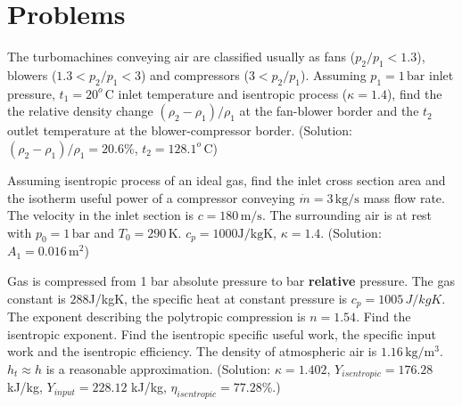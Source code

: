 \section{Problems}

\vspace{1cm}

The turbomachines conveying air are classified usually as fans ($p_2/p_1<1.3$), blowers ($1.3<p_2/p_1<3$) and compressors ($3<p_2/p_1$). Assuming $p_1=1\,\mathrm{bar}$ inlet pressure, $t_1=20^o\,\mathrm{C}$ inlet temperature and isentropic process ($\kappa=1.4$), find the the relative density change $(\rho_2-\rho_1)/\rho_1$ at the fan-blower border and the $t_2$ outlet temperature at the blower-compressor border. (Solution: $(\rho_2-\rho_1)/\rho_1=20.6\%$, $t_2=128.1^o\,\mathrm{C}$)

\vspace{1cm}

Assuming isentropic process of an ideal gas, find the inlet cross section area and the isotherm useful power of a compressor conveying $\dot m = 3\,\mathrm{kg/s}$ mass flow rate. The velocity in the inlet section is $c=180\,\mathrm{m/s}$. The surrounding air is at rest with $p_0=1\,\mathrm{bar}$ and $T_0=290\,\mathrm{K}$. $c_p=1000 \mathrm{J/kgK}$, $\kappa=1.4$.  (Solution: $A_1=0.016\,\mathrm{m^2}$)

\vspace{1cm}

Gas is compressed from 1 bar absolute pressure to  bar \textbf{relative} pressure. The gas constant is $288$J/kgK, the specific heat at constant pressure is $c_p = 1005\,J/kgK$. The exponent describing the polytropic compression is  $n = 1.54$. Find the isentropic exponent. Find the isentropic specific useful work, the specific input work and the isentropic efficiency. The density of atmospheric air is $1.16\, \mathrm{kg/m^3}$. $h_t\approx h$ is a reasonable approximation. 
(Solution: $\kappa=1.402$, $Y_{isentropic}=176.28$ kJ/kg, $Y_{input}=228.12$ kJ/kg, $\eta_{isentropic}=77.28$\%.)

